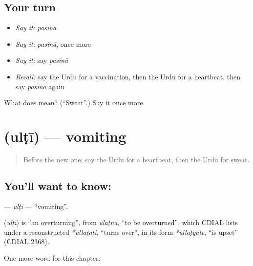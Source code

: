 \subsection*{Your turn}
\begin{itemize}
\raggedright
  \item \emph{Say it:} \emph{pasīnā}
  \item \emph{Say it:} \emph{pasīnā}, once more
  \item \emph{Say it:} say \emph{pasīnā}
  \item \emph{Recall:} say the Urdu for a vaccination, then the Urdu for a heartbeat, then say \emph{pasīnā} again
\end{itemize}

\begin{tcolorbox}[breakable,colback=teal!4,colframe=teal!35!black,title={Before you move on}]
What does  mean? (\textquotedblleft{}Sweat\textquotedblright{}.) Say it once more.
\end{tcolorbox}
\section[\texorpdfstring{\ur{الٹی} (ulṭī)}{الٹی (ulṭī)}]{ (ulṭī) — vomiting}

\label{lesson:UR-C154-ulti}



\begin{quote}
Before the new one: say the Urdu for a heartbeat, then the Urdu for sweat.
\end{quote}

\subsection*{You'll want to know: }
\textbf{} — \emph{ulṭī} — \textquotedblleft{}vomiting\textquotedblright{}.

\begin{cousinweb}
\textbf{} (\emph{ulṭī}) is \textquotedblleft{}an overturning\textquotedblright{}, from \emph{ulaṭnā}, \textquotedblleft{}to be overturned\textquotedblright{}, which CDIAL lists under a reconstructed \emph{*ullaṭati}, \textquotedblleft{}turns over\textquotedblright{}, in its form \emph{*ullaṭyate}, \textquotedblleft{}is upset\textquotedblright{} (CDIAL 2368).
\end{cousinweb}

\begin{grammarlens}[title={What you've built}]
One more word for this chapter.
\end{grammarlens}

